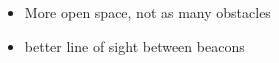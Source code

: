
\begin{itemize}
\item More open space, not as many obstacles
\item better line of sight between beacons
\end{itemize}
